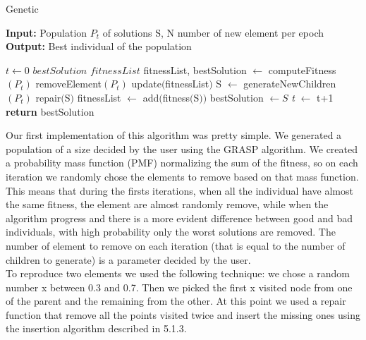 \begin{algorithm}
	\caption{Genetic}\label{Genetic method}
	\hspace*{\algorithmicindent} \textbf{Input:} Population $P_t$ of solutions S, N number of new element per epoch \\
	\hspace*{\algorithmicindent} \textbf{Output:} Best individual of the population
    \begin{algorithmic}[1]
    		\State $\textit{t} \leftarrow 0$
    		\State $\textit{bestSolution}$
    		\State $\textit{fitnessList}$
    		\State fitnessList, bestSolution $\leftarrow$ computeFitness$(P_t)$ 
    				\State removeElement$(P_t)$
    				\State update$($fitnessList$)$
    			\EndFor
    				\State S $\leftarrow$ generateNewChildren$(P_t)$
    				\State repair$($S$)$
    				\State fitnessList $\leftarrow$ add$($fitness$($S$))$
    					\State bestSolution $\leftarrow S$
    				\EndIf
    			\EndFor
    			\State \textit{t} $\leftarrow$ t+1
    		\EndWhile
    		\State \textbf{return} bestSolution 
    \end{algorithmic}
\end{algorithm}


\noindent Our first implementation of this algorithm was pretty simple. We generated a population of a size decided by the user using the GRASP algorithm. We created a probability mass function (PMF) normalizing the sum of the fitness, so on each iteration we randomly chose the elements to remove based on that mass function. This means that during the firsts iterations, when all the individual have almost the same fitness, the element are almost randomly remove, while when the algorithm progress and there is a more evident difference between good and bad individuals, with high probability only the worst solutions are removed. The number of element to remove on each iteration (that is equal to the number of children to generate) is a parameter decided by the user. \\
To reproduce two elements we used the following technique: we chose a random number x between 0.3 and 0.7. Then we picked the first x visited node from one of the parent and the remaining from the other. At this point we used a repair function that remove all the points visited twice and insert the missing ones using the insertion algorithm described in 5.1.3. 

